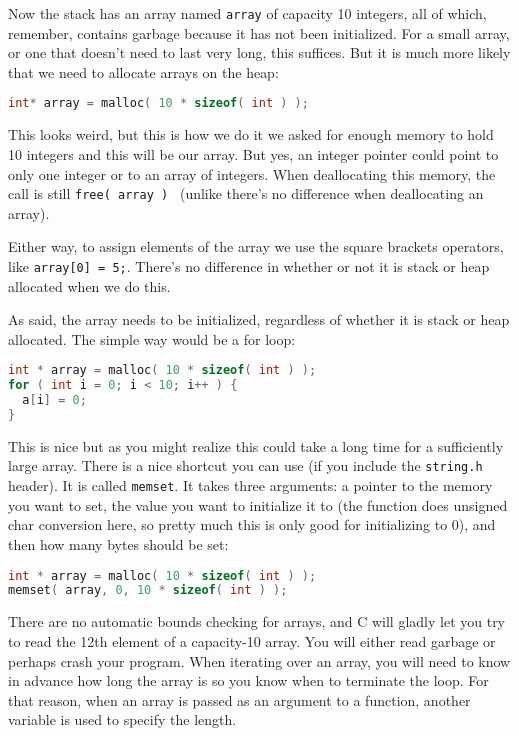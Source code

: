 Now the stack has an array named \texttt{array} of capacity 10 integers, all of which, remember, contains garbage because it has not been initialized. For a small array, or one that doesn't need to last very long, this suffices. But it is much more likely that we need to allocate arrays on the heap:

\begin{lstlisting}[language=C]
int* array = malloc( 10 * sizeof( int ) );
\end{lstlisting}

This looks weird, but this is how we do it we asked for enough memory to hold 10 integers and this will be our array. But yes, an integer pointer could point to only one integer or to an array of integers. When deallocating this memory, the call is still \texttt{free( array ) } (unlike \Cpp there's no difference when deallocating an array).

Either way, to assign elements of the array we use the square brackets operators, like \texttt{array[0] = 5;}. There's no difference in whether or not it is stack or heap allocated when we do this.

As said, the array needs to be initialized, regardless of whether it is stack or heap allocated. The simple way would be a for loop:

\begin{lstlisting}[language=C]
int * array = malloc( 10 * sizeof( int ) );
for ( int i = 0; i < 10; i++ ) {
  a[i] = 0;
}
\end{lstlisting}

This is nice but as you might realize this could take a long time for a sufficiently large array. There is a nice shortcut you can use (if you include the \texttt{string.h} header). It is called \texttt{memset}. It takes three arguments: a pointer to the memory you want to set, the value you want to initialize it to (the function does unsigned char conversion here, so pretty much this is only good for initializing to 0), and then how many bytes should be set:

\begin{lstlisting}[language=C]
int * array = malloc( 10 * sizeof( int ) );
memset( array, 0, 10 * sizeof( int ) );
\end{lstlisting}

There are no automatic bounds checking for arrays, and C will gladly let you try to read the 12th element of a capacity-10 array. You will either read garbage or perhaps crash your program. When iterating over an array, you will need to know in advance how long the array is so you know when to terminate the loop. For that reason, when an array is passed as an argument to a function, another variable is used to specify the length.


